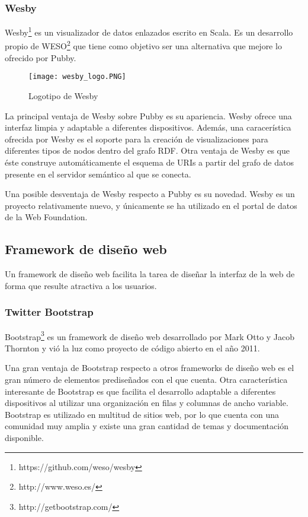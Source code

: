 \subsubsection{Wesby}
Wesby\footnote{https://github.com/weso/wesby} es un visualizador de datos enlazados escrito en Scala. Es un desarrollo propio de WESO\footnote{http://www.weso.es/} que tiene como objetivo ser una alternativa que mejore lo ofrecido por Pubby.

\begin{figure}[h]
\centering
\texttt{[image: wesby\_logo.PNG]}
\caption{Logotipo de Wesby}
\end{figure}

La principal ventaja de Wesby sobre Pubby es su apariencia. Wesby ofrece una interfaz limpia y adaptable a diferentes dispositivos. Además, una caracerística ofrecida por Wesby es el soporte para la creación de visualizaciones para diferentes tipos de nodos dentro del grafo RDF. Otra ventaja de Wesby es que éste construye automáticamente el esquema de URIs a partir del grafo de datos presente en el servidor semántico al que se conecta.

Una posible desventaja de Wesby respecto a Pubby es su novedad. Wesby es un proyecto relativamente nuevo, y únicamente se ha utilizado en el portal de datos de la Web Foundation.



\subsection{Framework de diseño web}
Un framework de diseño web facilita la tarea de diseñar la interfaz de la web de forma que resulte atractiva a los usuarios.


\subsubsection{Twitter Bootstrap}
Bootstrap\footnote{http://getbootstrap.com/} es un framework de diseño web desarrollado por Mark Otto y Jacob Thornton y vió la luz como proyecto de código abierto en el año 2011.

Una gran ventaja de Bootstrap respecto a otros frameworks de diseño web es el gran número de elementos prediseñados con el que cuenta. Otra característica interesante de Bootstrap es que facilita el desarrollo adaptable a diferentes dispositivos al utilizar una organización en filas y columnas de ancho variable.\\
Bootstrap es utilizado en multitud de sitios web, por lo que cuenta con una comunidad muy amplia y existe una gran cantidad de temas y documentación disponible.

